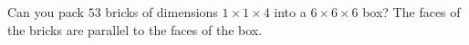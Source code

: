 Can you pack $53$ bricks of dimensions $1 \times 1 \times 4$ into a $6 \times 6 \times 6$ box? The faces of the bricks are parallel to the faces of the box.
